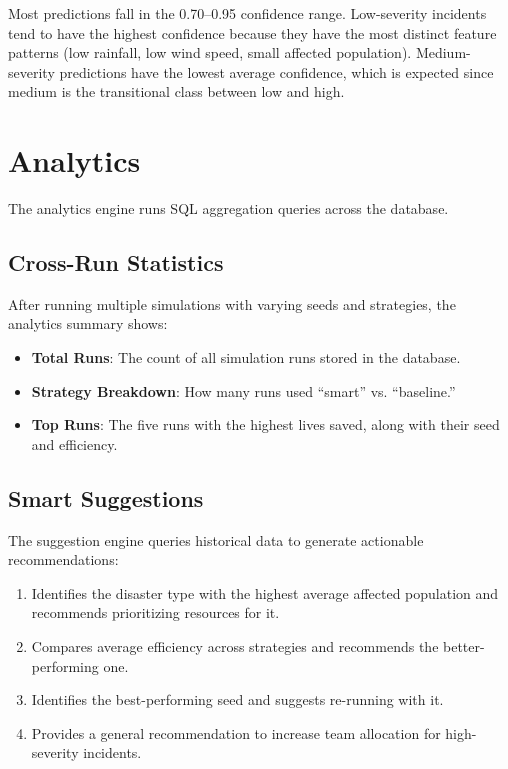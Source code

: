 Most predictions fall in the 0.70--0.95 confidence range. Low-severity incidents tend to have the highest confidence because they have the most distinct feature patterns (low rainfall, low wind speed, small affected population). Medium-severity predictions have the lowest average confidence, which is expected since medium is the transitional class between low and high.

\section{Analytics}
\label{sec:analytics_results}

The analytics engine runs SQL aggregation queries across the database.

\subsection{Cross-Run Statistics}

After running multiple simulations with varying seeds and strategies, the analytics summary shows:

\begin{itemize}[leftmargin=*]
    \item \textbf{Total Runs}: The count of all simulation runs stored in the database.
    \item \textbf{Strategy Breakdown}: How many runs used ``smart'' vs. ``baseline.''
    \item \textbf{Top Runs}: The five runs with the highest lives saved, along with their seed and efficiency.
\end{itemize}

\subsection{Smart Suggestions}

The suggestion engine queries historical data to generate actionable recommendations:

\begin{enumerate}[leftmargin=*]
    \item Identifies the disaster type with the highest average affected population and recommends prioritizing resources for it.
    \item Compares average efficiency across strategies and recommends the better-performing one.
    \item Identifies the best-performing seed and suggests re-running with it.
    \item Provides a general recommendation to increase team allocation for high-severity incidents.
\end{enumerate}

